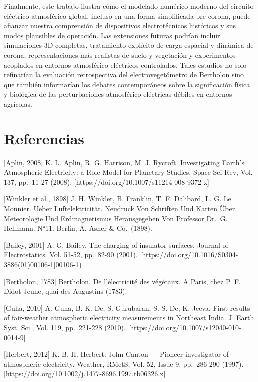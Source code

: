 \documentclass[
]{article}
\begin{document}
Finalmente, este trabajo ilustra cómo el modelado numérico moderno del
circuito eléctrico atmosférico global, incluso en una forma simplificada
pre-corona, puede afianzar nuestra comprensión de dispositivos
electrotécnicos históricos y sus modos plausibles de operación. Las
extensiones futuras podrían incluir simulaciones 3D completas,
tratamiento explícito de carga espacial y dinámica de corona,
representaciones más realistas de suelo y vegetación y experimentos
acoplados en entornos atmosférico-eléctricos controlados. Tales estudios
no solo refinarían la evaluación retrospectiva del electrovegetómetro de
Bertholon sino que también informarían los debates contemporáneos sobre
la significación física y biológica de las perturbaciones
atmosférico-eléctricas débiles en entornos agrícolas.

\section{Referencias}\label{referencias}

{[}Aplin, 2008{]} K. L. Aplin, R. G. Harrison, M. J. Rycroft.
Investigating Earth's Atmospheric Electricity: a Role Model for
Planetary Studies. Space Sci Rev, Vol. 137, pp.~11-27 (2008).
{[}https://doi.org/10.1007/s11214-008-9372-x{]}

{[}Winkler et al., 1898{]} J. H. Winkler, B. Franklin, T. F. Dalibard,
L. G. Le Monnier. Ueber Luftelektricität. Neudruck Von Schriften Und
Karten Über Meteorologie Und Erdmagnetismus Herausgegeben Von Professor
Dr.~G. Hellmann. N°11. Berlin, A. Asher \& Co.~(1898).

{[}Bailey, 2001{]} A. G. Bailey. The charging of insulator surfaces.
Journal of Electrostatics. Vol. 51-52, pp.~82-90 (2001).
{[}https://doi.org/10.1016/S0304-3886(01)00106-1{]}00106-1)

{[}Bertholon, 1783{]} Bertholon. De l'électricité des végétaux. A Paris,
chez P. F. Didot Jeune, quai des Augustins (1783).

{[}Guha, 2010{]} A. Guha, B. K. De, S. Gurubaran, S. S. De, K. Jeeva.
First results of fair-weather atmospheric electricity measurements in
Northeast India. J. Earth Syst. Sci., Vol. 119, pp.~221-228 (2010).
{[}https://doi.org/10.1007/s12040-010-0014-9{]}

{[}Herbert, 2012{]} K. B. H. Herbert. John Canton --- Pioneer
investigator of atmospheric electricity. Weather, RMetS, Vol. 52, Issue
9, pp.~286-290 (1997).
{[}https://doi.org/10.1002/j.1477-8696.1997.tb06326.x{]}
\end{document}
